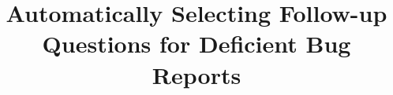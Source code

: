 \documentclass[10pt,conference]{IEEEtran}
\begin{document}
\title{Automatically Selecting Follow-up Questions for Deficient Bug Reports}



\author{
\IEEEauthorblockN{}



}

\maketitle
\end{document}
